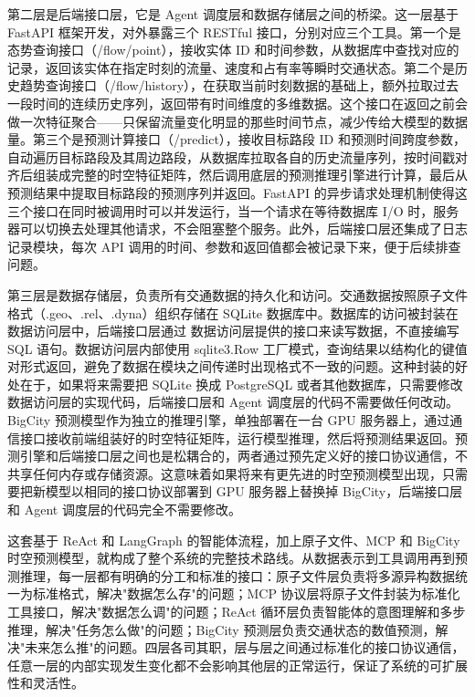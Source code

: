 第二层是后端接口层，它是 Agent 调度层和数据存储层之间的桥梁。这一层基于 FastAPI 框架开发，对外暴露三个 RESTful 接口，分别对应三个工具。第一个是态势查询接口（/flow/point），接收实体 ID 和时间参数，从数据库中查找对应的记录，返回该实体在指定时刻的流量、速度和占有率等瞬时交通状态。第二个是历史趋势查询接口（/flow/history），在获取当前时刻数据的基础上，额外拉取过去一段时间的连续历史序列，返回带有时间维度的多维数据。这个接口在返回之前会做一次特征聚合——只保留流量变化明显的那些时间节点，减少传给大模型的数据量。第三个是预测计算接口（/predict），接收目标路段 ID 和预测时间跨度参数，自动遍历目标路段及其周边路段，从数据库拉取各自的历史流量序列，按时间戳对齐后组装成完整的时空特征矩阵，然后调用底层的预测推理引擎进行计算，最后从预测结果中提取目标路段的预测序列并返回。FastAPI 的异步请求处理机制使得这三个接口在同时被调用时可以并发运行，当一个请求在等待数据库 I/O 时，服务器可以切换去处理其他请求，不会阻塞整个服务。此外，后端接口层还集成了日志记录模块，每次 API 调用的时间、参数和返回值都会被记录下来，便于后续排查问题。

第三层是数据存储层，负责所有交通数据的持久化和访问。交通数据按照原子文件格式（.geo、.rel、.dyna）组织存储在 SQLite 数据库中。数据库的访问被封装在数据访问层中，后端接口层通过 数据访问层提供的接口来读写数据，不直接编写 SQL 语句。数据访问层内部使用 sqlite3.Row 工厂模式，查询结果以结构化的键值对形式返回，避免了数据在模块之间传递时出现格式不一致的问题。这种封装的好处在于，如果将来需要把 SQLite 换成 PostgreSQL 或者其他数据库，只需要修改 数据访问层的实现代码，后端接口层和 Agent 调度层的代码不需要做任何改动。BigCity 预测模型作为独立的推理引擎，单独部署在一台 GPU 服务器上，通过通信接口接收前端组装好的时空特征矩阵，运行模型推理，然后将预测结果返回。预测引擎和后端接口层之间也是松耦合的，两者通过预先定义好的接口协议通信，不共享任何内存或存储资源。这意味着如果将来有更先进的时空预测模型出现，只需要把新模型以相同的接口协议部署到 GPU 服务器上替换掉 BigCity，后端接口层和 Agent 调度层的代码完全不需要修改。

这套基于 ReAct 和 LangGraph 的智能体流程，加上原子文件、MCP 和 BigCity 时空预测模型，就构成了整个系统的完整技术路线。从数据表示到工具调用再到预测推理，每一层都有明确的分工和标准的接口：原子文件层负责将多源异构数据统一为标准格式，解决"数据怎么存"的问题；MCP 协议层将原子文件封装为标准化工具接口，解决"数据怎么调"的问题；ReAct 循环层负责智能体的意图理解和多步推理，解决"任务怎么做"的问题；BigCity 预测层负责交通状态的数值预测，解决"未来怎么推"的问题。四层各司其职，层与层之间通过标准化的接口协议通信，任意一层的内部实现发生变化都不会影响其他层的正常运行，保证了系统的可扩展性和灵活性。
